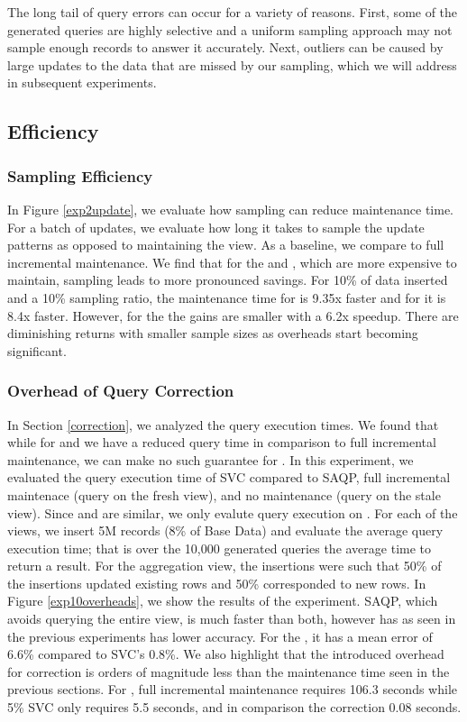 The long tail of query errors can occur for a variety of reasons.
First, some of the generated queries are highly selective and a uniform sampling approach may not sample enough records to answer it accurately.
Next, outliers can be caused by large updates to the data that are missed by our sampling, which we will address in subsequent experiments.

\subsection{Efficiency}

\subsubsection{Sampling Efficiency}
In Figure \ref{exp2update}, we evaluate how sampling can reduce maintenance time.
For a batch of updates, we evaluate how long it takes to sample the update patterns as opposed to maintaining the view.
As a baseline, we compare to full incremental maintenance.
We find that for the \aggview and \fjview, which are more expensive to maintain, sampling leads to more pronounced savings. 
For 10\% of data inserted and a 10\% sampling ratio, the maintenance time for \fjview  is 9.35x faster and for \aggview it is 8.4x faster.
However, for the \spview the gains are smaller with a 6.2x speedup.
There are diminishing returns with smaller sample sizes as overheads start becoming significant. 

\subsubsection{Overhead of Query Correction}
In Section \ref{correction}, we analyzed the query execution times.
We found that while for \spview and \fjview we have a reduced query time in comparison to full incremental maintenance, we can make no such
guarantee for \aggview.
In this experiment, we evaluated the query execution time of SVC compared to SAQP, full incremental maintenace (query on the fresh view), and no maintenance (query on the stale view).
Since \spview and \fjview are similar, we only evalute query execution on \fjview.
For each of the views, we insert 5M records (8\% of Base Data) and evaluate the average query execution time; that is over the 10,000 generated queries the average time to return a result. 
For the aggregation view, the insertions were such that 50\% of the insertions updated existing rows and 50\% corresponded to new rows.
In Figure \ref{exp10overheads}, we show the results of the experiment.
SAQP, which avoids querying the entire view, is much faster than both, however has as seen in the previous experiments has lower accuracy. 
For the \aggview, it has a mean error of 6.6\% compared to SVC's 0.8\%.
We also highlight that the introduced overhead for correction is orders of magnitude less than the maintenance time seen in the previous sections.
For \aggview, full incremental maintenance requires 106.3 seconds while 5\% SVC only requires 5.5 seconds, and in comparison the correction 0.08 seconds.

